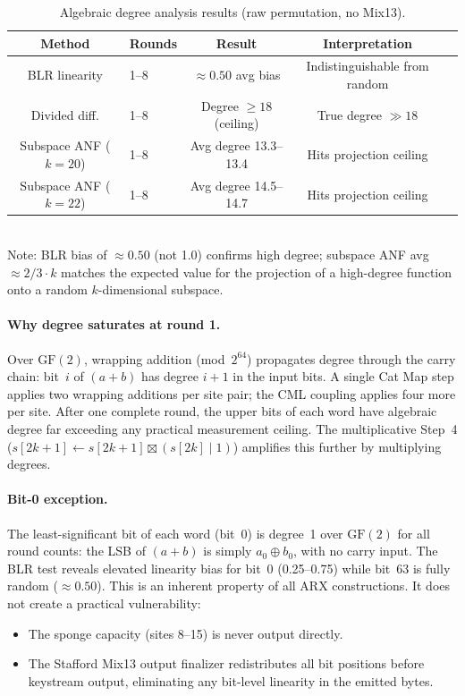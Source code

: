 \documentclass[runningheads]{llncs}
\begin{document}
\begin{table}[h]
\centering
\caption{Algebraic degree analysis results (raw permutation, no Mix13).}
\label{tab:algdeg}
\begin{tabular}{@{}clccc@{}}
\toprule
Method & Rounds & Result & Interpretation \\
\midrule
BLR linearity & 1--8 & $\approx 0.50$ avg bias & Indistinguishable from random \\
Divided diff. & 1--8 & Degree $\geq 18$ (ceiling) & True degree $\gg 18$ \\
Subspace ANF ($k=20$) & 1--8 & Avg degree 13.3--13.4 & Hits projection ceiling \\
Subspace ANF ($k=22$) & 1--8 & Avg degree 14.5--14.7 & Hits projection ceiling \\
\bottomrule
\end{tabular}
\\[4pt]
{\footnotesize Note: BLR bias of $\approx 0.50$ (not 1.0) confirms high degree;
subspace ANF avg $\approx 2/3 \cdot k$ matches the expected value for the
projection of a high-degree function onto a random $k$-dimensional subspace.}
\end{table}

\paragraph{Why degree saturates at round 1.}
Over $\mathrm{GF}(2)$, wrapping addition (mod~$2^{64}$) propagates degree through
the carry chain: bit~$i$ of $(a + b)$ has degree $i+1$ in the input bits.  A single
Cat Map step applies two wrapping additions per site pair; the CML coupling applies
four more per site.  After one complete round, the upper bits of each word have
algebraic degree far exceeding any practical measurement ceiling.  The multiplicative
Step~4 ($s[2k+1] \gets s[2k+1] \boxtimes (s[2k] \mathbin{|} 1)$) amplifies this
further by multiplying degrees.

\paragraph{Bit-0 exception.}
The least-significant bit of each word (bit~0) is degree~1 over $\mathrm{GF}(2)$
for all round counts: the LSB of $(a + b)$ is simply $a_0 \oplus b_0$, with no
carry input.  The BLR test reveals elevated linearity bias for bit~0 (0.25--0.75)
while bit~63 is fully random ($\approx 0.50$).  This is an inherent property of
all ARX constructions.  It does not create a practical vulnerability:
\begin{itemize}[nosep]
\item The sponge capacity (sites 8--15) is never output directly.
\item The Stafford Mix13 output finalizer redistributes all bit positions before
  keystream output, eliminating any bit-level linearity in the emitted bytes.
\end{itemize}
\end{document}
